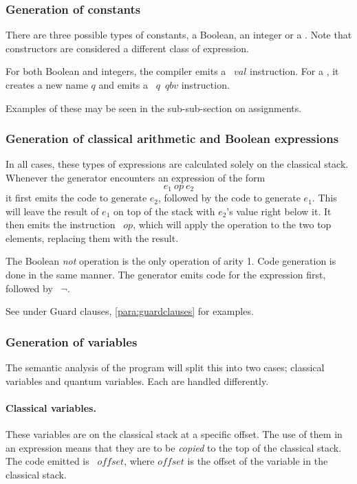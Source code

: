 \subsubsection{Generation of constants}
There are three possible types of constants, a Boolean, an integer or 
a \qubit. Note that constructors are considered a different class of 
expression.

For both Boolean and integers, the compiler emits a ~$val$ 
instruction. For a \qubit, it creates a new name $q$ and emits
a ~$q$~$qbv$ instruction.

Examples of these may be seen in the sub-sub-section on assignments.

\subsubsection{Generation of classical arithmetic and Boolean expressions}
In all cases, these types of expressions are calculated solely on 
the classical stack. Whenever the generator encounters 
 an expression of the form
\[ e_1\ op\ e_2\]
it first emits the code to generate $e_2$, followed by the code to generate
$e_1$. This will leave the result of $e_1$ on top of the stack with $e_2$'s
value right below it. 
It then emits the instruction ~$op$, which will
apply the operation to the two top elements, replacing them with the
result.

The Boolean \emph{not} operation is the only operation of arity 1. 
Code generation is done in the same manner. The generator emits code for the 
expression first, followed by ~$\neg$.

 See  under Guard clauses, \vref{para:guardclauses} for
examples.

\subsubsection{Generation of variables}
The semantic analysis of the program will split this into two cases; 
classical variables and quantum variables. Each are handled differently.

\paragraph{Classical variables.} These variables are on the classical
stack at a specific offset. The use of them in an expression means 
that they are to be \emph{copied} to the top of the classical stack.
The code emitted is ~$offset$, where $offset$ is the 
offset of the variable in the classical stack.

